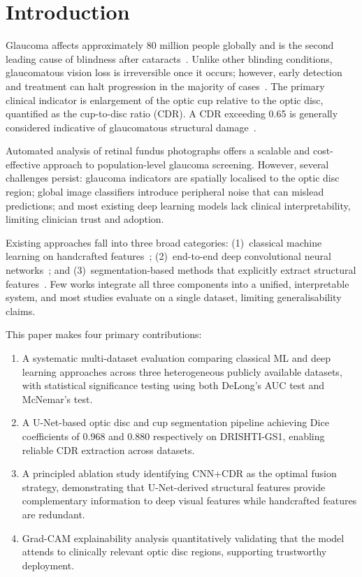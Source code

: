 \documentclass[conference]{IEEEtran}
\begin{document}
\section{Introduction}
 
Glaucoma affects approximately 80 million people globally and is
the second leading cause of blindness after cataracts~\cite{tham2014}.
Unlike other blinding conditions, glaucomatous vision loss is
irreversible once it occurs; however, early detection and treatment
can halt progression in the majority of cases~\cite{weinreb2004}.
The primary clinical indicator is enlargement of the optic cup
relative to the optic disc, quantified as the cup-to-disc ratio
(CDR). A CDR exceeding 0.65 is generally considered indicative of
glaucomatous structural damage~\cite{jonas1988}.
 
Automated analysis of retinal fundus photographs offers a scalable
and cost-effective approach to population-level glaucoma screening.
However, several challenges persist: glaucoma indicators are
spatially localised to the optic disc region; global image
classifiers introduce peripheral noise that can mislead predictions;
and most existing deep learning models lack clinical interpretability,
limiting clinician trust and adoption.
 
Existing approaches fall into three broad categories:
(1)~classical machine learning on handcrafted
features~\cite{niemeijer2007}; (2)~end-to-end deep convolutional
neural networks~\cite{chen2015}; and (3)~segmentation-based methods
that explicitly extract structural features~\cite{orlando2020}.
Few works integrate all three components into a unified,
interpretable system, and most studies evaluate on a single dataset,
limiting generalisability claims.
 
This paper makes four primary contributions:
\begin{enumerate}
  \item A systematic multi-dataset evaluation comparing classical ML
  and deep learning approaches across three heterogeneous publicly
  available datasets, with statistical significance testing using
  both DeLong's AUC test and McNemar's test.
  \item A U-Net-based optic disc and cup segmentation pipeline
  achieving Dice coefficients of 0.968 and 0.880 respectively on
  DRISHTI-GS1, enabling reliable CDR extraction across datasets.
  \item A principled ablation study identifying CNN+CDR as the
  optimal fusion strategy, demonstrating that U-Net-derived
  structural features provide complementary information to deep
  visual features while handcrafted features are redundant.
  \item Grad-CAM explainability analysis quantitatively validating
  that the model attends to clinically relevant optic disc regions,
  supporting trustworthy deployment.
\end{enumerate}
 
\end{document}

